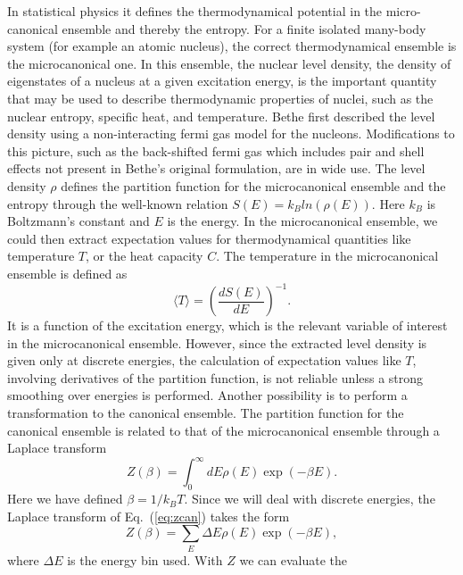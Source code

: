 \documentclass[%
oneside,                 %
final,                   %
10pt]{article}
\begin{document}
In statistical physics it defines the thermodynamical potential in the micro-canonical ensemble and thereby the entropy.
For a finite isolated many-body system (for example an atomic nucleus), the correct
thermodynamical ensemble is the microcanonical one. In this ensemble,
the nuclear level density, the density of eigenstates of a nucleus
at a given excitation energy, is the important quantity that may be
used to describe thermodynamic properties of nuclei, such as the 
nuclear entropy, specific heat, and temperature. 
Bethe first described the level density using a 
non-interacting fermi gas model
for the nucleons.
Modifications to this picture, such as the 
back-shifted fermi gas which includes pair and
shell effects not present in Bethe's original formulation, are in 
wide use.  
The level density
$\rho$ defines the partition function for 
the microcanonical ensemble and the entropy through the well-known
relation $S(E)=k_Bln(\rho(E))$.
Here $k_B$ is Boltzmann's constant and $E$ is the energy.  In 
the microcanonical ensemble, we could then extract expectation values 
for thermodynamical quantities like temperature $T$, or the 
heat capacity $C$. The temperature in the microcanonical ensemble 
is defined as 
\begin{equation}
      \langle T\rangle=\left(\frac{dS(E)}{dE}\right)^{-1}.
      \label{eq:temp}
\end{equation}
It is a function of the excitation energy, which is 
the relevant variable of interest in the microcanonical ensemble. 
However, since the extracted level density is given only at discrete 
energies, the calculation of expectation values 
like $T$, involving derivatives of the partition function, is not
reliable unless a strong smoothing over energies is 
performed. Another possibility
is to perform a transformation to the canonical ensemble.
The partition function for the 
canonical ensemble is related to that of the 
microcanonical ensemble through a Laplace transform
\begin{equation}
     Z(\beta)=\int_0^{\infty}dE\rho(E)\exp{(-\beta E)}.
     \label{eq:zcan}
\end{equation}
Here we have defined $\beta=1/k_BT$.
Since we will  deal with discrete energies, the 
Laplace transform of Eq.\ (\ref{eq:zcan}) takes the form
\begin{equation}
         Z(\beta)=\sum_E \Delta E\rho(E)\exp{(-\beta E)},
         \label{eq:zactual}
\end{equation}
where $\Delta E$ is the energy bin used.
With $Z$ we can evaluate the 
\end{document}
